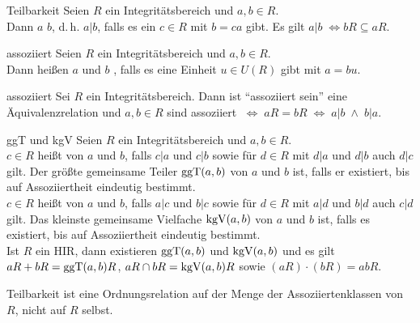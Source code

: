 \begin{Def}{Teilbarkeit}
    Seien $R$ ein Integritätsbereich und $a, b \in R$. \\
    Dann  $a$ $b$, d.\,h. $a|b$, falls es ein $c \in R$ mit
    $b = ca$ gibt.
    Es gilt $a|b \;\Leftrightarrow bR \subseteq aR$.
\end{Def}

\begin{Def}{assoziiert}
    Seien $R$ ein Integritätsbereich und $a, b \in R$. \\
    Dann heißen $a$ und $b$ , falls es eine Einheit
    $u \in U(R)$ gibt mit $a = bu$.
\end{Def}

\begin{Lemma}{assoziiert}
    Sei $R$ ein Integritätsbereich.
    Dann ist "`assoziiert sein"' eine Äquivalenzrelation
    und $a, b \in R$ sind assoziiert $\;\Leftrightarrow\; aR = bR
    \;\Leftrightarrow\; a|b \;\land\; b|a$.
\end{Lemma}

\begin{Def}{ggT und kgV}
    Seien $R$ ein Integritätsbereich und $a, b \in R$. \\
    $c \in R$ heißt  von $a$ und $b$,
    falls $c|a$ und $c|b$ sowie
    für $d \in R$ mit $d|a$ und $d|b$ auch $d|c$ gilt.
    Der größte gemeinsame Teiler $\operatorname{ggT}(a, b)$ von $a$ und $b$ ist,
    falls er existiert, bis auf Assoziiertheit eindeutig bestimmt. \\
    $c \in R$ heißt  von $a$ und $b$,
    falls $a|c$ und $b|c$ sowie
    für $d \in R$ mit $a|d$ und $b|d$ auch $c|d$ gilt.
    Das kleinste gemeinsame Vielfache $\operatorname{kgV}(a, b)$ von $a$ und $b$ ist,
    falls es existiert, bis auf Assoziiertheit eindeutig bestimmt. \\
    Ist $R$ ein HIR, dann existieren $\operatorname{ggT}(a, b)$ und $\operatorname{kgV}(a, b)$ und es
    gilt \\
    $aR + bR = \operatorname{ggT}(a, b)R$, \qquad
    $aR \cap bR = \operatorname{kgV}(a, b)R$ \quad sowie \quad
    $(aR) \cdot (bR) = abR$.
\end{Def}

\begin{Bem}
    Teilbarkeit ist eine Ordnungsrelation auf der Menge der Assoziiertenklassen
    von $R$, nicht auf $R$ selbst.
\end{Bem}

\pagebreak

